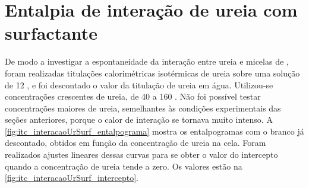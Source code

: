 

%
\FloatBarrier
\section{Entalpia de interação de ureia com surfactante}

	De modo a investigar a espontaneidade da interação entre ureia e micelas de \TTAB{}, foram realizadas titulações calorimétricas isotérmicas de ureia sobre uma solução de \TTAB{} 12 \mM, e foi descontado o valor da titulação de ureia em água. Utilizou-se concentrações crescentes de ureia, de 40 a 160 \mM. Não foi possível testar concentrações maiores de ureia, semelhantes às condições experimentais das seções anteriores, porque o calor de interação se tornava muito intenso. A \autoref{fig:itc_interacaoUrSurf_entalpograma} mostra os entalpogramas com o branco já descontado, obtidos em função da concentração de ureia na cela. Foram realizados ajustes lineares  dessas curvas para se obter o valor do intercepto quando a concentração de ureia tende a zero. Os valores estão na \autoref{fig:itc_interacaoUrSurf_intercepto}.
	

